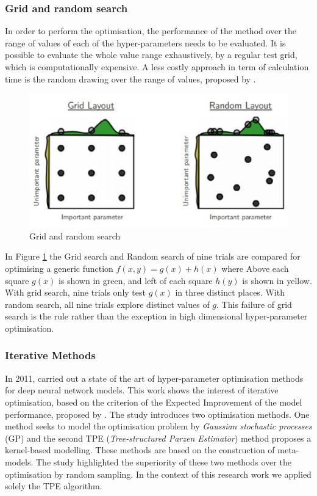 \subsubsection{Grid and random search} \label{Grid and Random search}

In order to perform the optimisation, the performance of the method over the range of values of each of the hyper-parameters needs to be evaluated. It is possible to evaluate the whole value range exhaustively, by a regular test grid, which is computationally expensive. A less costly approach in term of calculation time is the random drawing over the range of values, proposed by \citep{bergstra2012random}. 
\begin{figure}
\centerline{\includegraphics[scale=0.7]{images/chapter_2/random_search.eps}}
\caption{Grid and random search \citep{bergstra2012random}}
\label{fig:Grid and Random Search}
\end{figure}
In Figure \ref{fig:Grid and Random Search} the Grid search and Random search of nine trials are compared for optimising a generic function $f(x, y) = g(x) + h(x)$ where Above each square $g(x)$ is shown in green, and left of each square $h(y)$ is shown in yellow. With grid search, nine trials only test $g(x)$ in three distinct places. With random search, all nine trials explore distinct values of $g$. This failure of grid search is the rule rather than the exception in high dimensional hyper-parameter optimisation.

\subsubsection{Iterative Methods}

In 2011, \citep{bergstra2011algorithms} carried out a state of the art of hyper-parameter optimisation methods for deep neural network models. This work shows the interest of iterative optimisation, based on the criterion of the Expected Improvement of the model performance, proposed by \citep{jones2001taxonomy}. The study introduces two optimisation methods. One method seeks to model the optimisation problem by \textit{Gaussian stochastic processes} (GP) and the second TPE (\textit{Tree-structured Parzen Estimator}) method proposes a kernel-based modelling. These methods are based on the construction of meta-models. The study highlighted the superiority of these two methods over the optimisation by random sampling. In the context of this research work we applied solely the TPE algorithm.

